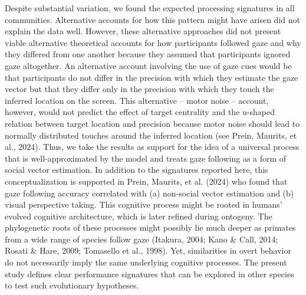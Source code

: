 \documentclass[
  man,floatsintext]{apa7}
\begin{document}
Despite substantial variation, we found the expected processing signatures in all communities. Alternative accounts for how this pattern might have arisen did not explain the data well. However, these alternative approaches did not present viable alternative theoretical accounts for how participants followed gaze and why they differed from one another because they assumed that participants ignored gaze altogether. An alternative account involving the use of gaze cues would be that participants do not differ in the precision with which they estimate the gaze vector but that they differ only in the precision with which they touch the inferred location on the screen. This alternative -- motor noise -- account, however, would not predict the effect of target centrality and the u-shaped relation between target location and precision because motor noise should lead to normally distributed touches around the inferred location (see Prein, Maurits, et al., 2024). Thus, we take the results as support for the idea of a universal process that is well-approximated by the model and treats gaze following as a form of social vector estimation. In addition to the signatures reported here, this conceptualization is supported in Prein, Maurits, et al. (2024) who found that gaze following accuracy correlated with (a) non-social vector estimation and (b) visual perspective taking. This cognitive process might be rooted in humans' evolved cognitive architecture, which is later refined during ontogeny. The phylogenetic roots of these processes might possibly lie much deeper as primates from a wide range of species follow gaze (Itakura, 2004; Kano \& Call, 2014; Rosati \& Hare, 2009; Tomasello et al., 1998). Yet, similarities in overt behavior do not necessarily imply the same underlying cognitive processes. The present study defines clear performance signatures that can be explored in other species to test such evolutionary hypotheses.
\end{document}
